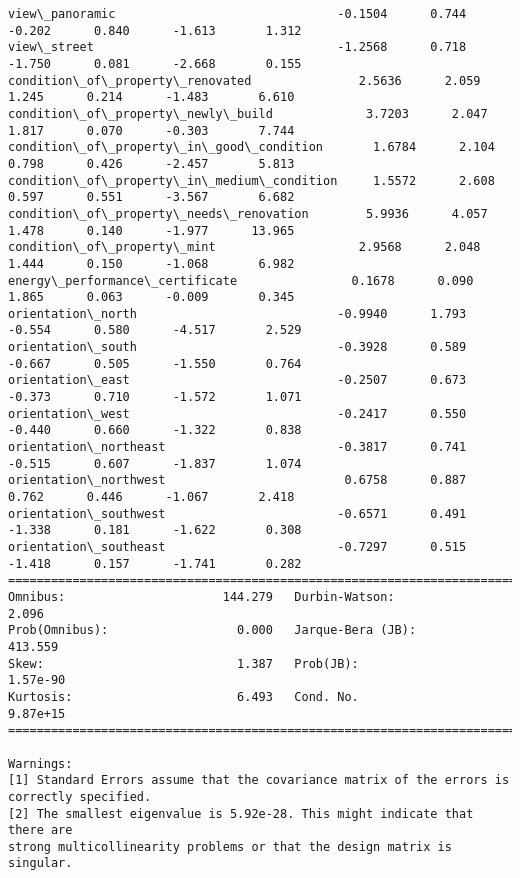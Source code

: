 \documentclass[11pt]{article}
\begin{document}
\begin{Verbatim}[commandchars=\\\{\}]
view\_panoramic                               -0.1504      0.744     -0.202      0.840      -1.613       1.312
view\_street                                  -1.2568      0.718     -1.750      0.081      -2.668       0.155
condition\_of\_property\_renovated               2.5636      2.059      1.245      0.214      -1.483       6.610
condition\_of\_property\_newly\_build             3.7203      2.047      1.817      0.070      -0.303       7.744
condition\_of\_property\_in\_good\_condition       1.6784      2.104      0.798      0.426      -2.457       5.813
condition\_of\_property\_in\_medium\_condition     1.5572      2.608      0.597      0.551      -3.567       6.682
condition\_of\_property\_needs\_renovation        5.9936      4.057      1.478      0.140      -1.977      13.965
condition\_of\_property\_mint                    2.9568      2.048      1.444      0.150      -1.068       6.982
energy\_performance\_certificate                0.1678      0.090      1.865      0.063      -0.009       0.345
orientation\_north                            -0.9940      1.793     -0.554      0.580      -4.517       2.529
orientation\_south                            -0.3928      0.589     -0.667      0.505      -1.550       0.764
orientation\_east                             -0.2507      0.673     -0.373      0.710      -1.572       1.071
orientation\_west                             -0.2417      0.550     -0.440      0.660      -1.322       0.838
orientation\_northeast                        -0.3817      0.741     -0.515      0.607      -1.837       1.074
orientation\_northwest                         0.6758      0.887      0.762      0.446      -1.067       2.418
orientation\_southwest                        -0.6571      0.491     -1.338      0.181      -1.622       0.308
orientation\_southeast                        -0.7297      0.515     -1.418      0.157      -1.741       0.282
==============================================================================
Omnibus:                      144.279   Durbin-Watson:                   2.096
Prob(Omnibus):                  0.000   Jarque-Bera (JB):              413.559
Skew:                           1.387   Prob(JB):                     1.57e-90
Kurtosis:                       6.493   Cond. No.                     9.87e+15
==============================================================================

Warnings:
[1] Standard Errors assume that the covariance matrix of the errors is correctly specified.
[2] The smallest eigenvalue is 5.92e-28. This might indicate that there are
strong multicollinearity problems or that the design matrix is singular.

    \end{Verbatim}
\end{document}
